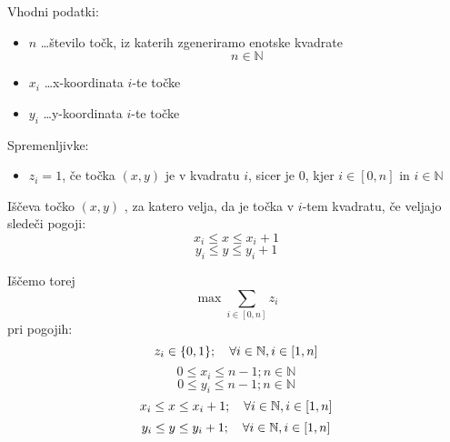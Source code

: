 \documentclass[a4, 12pt]{article}
\begin{document}
Vhodni podatki:
\begin{itemize}
\item{$n$ \dots število točk, iz katerih zgeneriramo enotske kvadrate} $$n \in \mathbb{N}$$
\item{$x_{i}$ \dots x-koordinata $i$-te točke}
\item{$y_{i}$ \dots y-koordinata $i$-te točke}
\end{itemize}

Spremenljivke:
\begin{itemize}
\item{$z_{i}= 1$, če točka $(x,y)$ je v kvadratu $i$}, sicer je $0$, kjer $ i\in [0,n]$ in $i \in \mathbb{N}$
\end{itemize}


Iščeva točko $(x,y)$ , za katero velja, da je točka v $i$-tem kvadratu, če veljajo sledeči pogoji:
$$x_i \le x \le x_i+1$$
$$y_i \le y \le y_i+1$$

Iščemo torej \\
$$\max \sum_{i\in [0,n] } z_{i} $$
pri pogojih:
$$z_{i} \in \{0,1\}; \quad\forall i \in \mathbb{N}, i \in [1,n]\\$$
$$ 0 \le x_i \le n-1; n \in \mathbb{N} $$
$$ 0 \le y_i \le n-1; n \in \mathbb{N}$$
$$ x_i \le x \le x_i+1; \quad\forall i \in \mathbb{N}, i \in [1,n]\\ $$
$$ y_i \le y \le y_i+1; \quad\forall i \in \mathbb{N}, i \in [1,n]\\ $$
\end{document}
